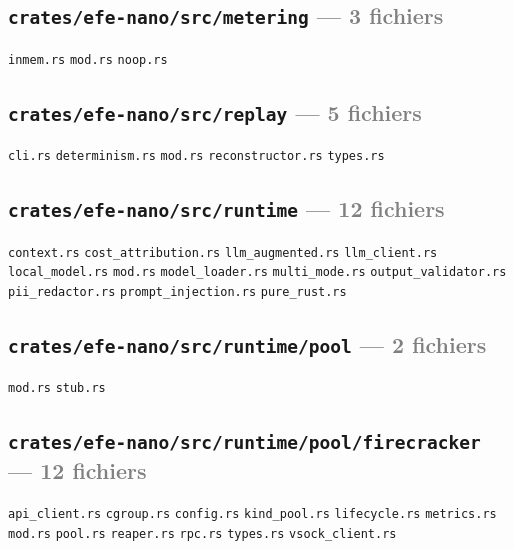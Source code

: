 \documentclass[10pt]{report}
\newcommand{\code}[1]{\texttt{\small #1}}
\begin{document}
\subsection*{\code{crates/efe-nano/src/metering} \normalfont\textcolor{grey}{--- 3 fichiers}}
\begin{sloppypar}\footnotesize\raggedright
\code{inmem.rs} \;\textbullet\; \code{mod.rs} \;\textbullet\; \code{noop.rs}
\end{sloppypar}

\subsection*{\code{crates/efe-nano/src/replay} \normalfont\textcolor{grey}{--- 5 fichiers}}
\begin{sloppypar}\footnotesize\raggedright
\code{cli.rs} \;\textbullet\; \code{determinism.rs} \;\textbullet\; \code{mod.rs} \;\textbullet\; \code{reconstructor.rs} \;\textbullet\; \code{types.rs}
\end{sloppypar}

\subsection*{\code{crates/efe-nano/src/runtime} \normalfont\textcolor{grey}{--- 12 fichiers}}
\begin{sloppypar}\footnotesize\raggedright
\code{context.rs} \;\textbullet\; \code{cost\_attribution.rs} \;\textbullet\; \code{llm\_augmented.rs} \;\textbullet\; \code{llm\_client.rs} \;\textbullet\; \code{local\_model.rs} \;\textbullet\; \code{mod.rs} \;\textbullet\; \code{model\_loader.rs} \;\textbullet\; \code{multi\_mode.rs} \;\textbullet\; \code{output\_validator.rs} \;\textbullet\; \code{pii\_redactor.rs} \;\textbullet\; \code{prompt\_injection.rs} \;\textbullet\; \code{pure\_rust.rs}
\end{sloppypar}

\subsection*{\code{crates/efe-nano/src/runtime/pool} \normalfont\textcolor{grey}{--- 2 fichiers}}
\begin{sloppypar}\footnotesize\raggedright
\code{mod.rs} \;\textbullet\; \code{stub.rs}
\end{sloppypar}

\subsection*{\code{crates/efe-nano/src/runtime/pool/firecracker} \normalfont\textcolor{grey}{--- 12 fichiers}}
\begin{sloppypar}\footnotesize\raggedright
\code{api\_client.rs} \;\textbullet\; \code{cgroup.rs} \;\textbullet\; \code{config.rs} \;\textbullet\; \code{kind\_pool.rs} \;\textbullet\; \code{lifecycle.rs} \;\textbullet\; \code{metrics.rs} \;\textbullet\; \code{mod.rs} \;\textbullet\; \code{pool.rs} \;\textbullet\; \code{reaper.rs} \;\textbullet\; \code{rpc.rs} \;\textbullet\; \code{types.rs} \;\textbullet\; \code{vsock\_client.rs}
\end{sloppypar}
\end{document}
